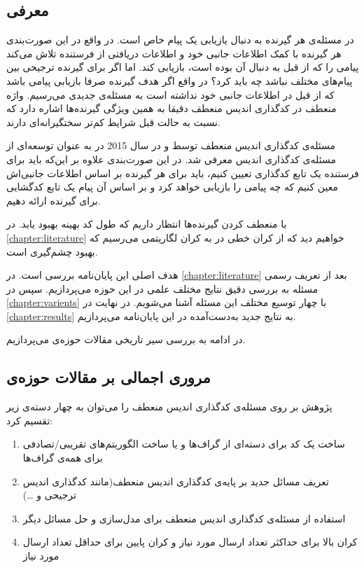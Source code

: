  \subsection{معرفی}
 در مسئله‌ی
 \icod
 هر گیرنده به دنبال یازیابی یک پیام خاص است. در واقع در این صورت‌بندی هر گیرنده با کمک اطلاعات جانبی خود و اطلاعات دریافتی از فرستنده تلاش می‌کند پیامی را که از قبل به دنبال آن بوده است، بازیابی کند. اما اگر برای گیرنده ترجیحی بین پیام‌های مختلف نباشد چه باید کرد؟ در واقع اگر هدف گیرنده صرفا بازیابی پیامی باشد که از قبل در اطلاعات جانبی خود نداشته است به مسئله‌ی جدیدی می‌رسیم. واژه منعطف در کدگذاری اندیس منعطف دقیقا به همین ویژگی گیرنده‌ها اشاره دارد که نسبت به حالت قبل شرایط کم‌تر سختگیرانه‌ای دارند.
 
 مسئله‌ی کدگذاری اندیس منعطف توسط 
 و 
  در سال 2015 در
 \cite{pliablefirstpaper}
 به عنوان توسعه‌ای از مسئله‌ی کدگذاری اندیس معرفی شد. در این صورت‌بندی علاوه بر این‌که باید برای فرستنده یک تابع کدگذاری تعیین کنیم، باید برای هر گیرنده بر اساس اطلاعات جانبی‌اش معین کنیم که چه پیامی را بازيابی خواهد کرد و بر اساس آن پیام یک تابع کدگشایی برای گیرنده ارائه دهیم.
 
 با منعطف کردن گیرنده‌ها انتظار داریم که طول کد بهینه بهبود یابد. در 
 \autoref{chapter:literature}
 خواهیم دید که از کران خطی در
 \icod
 به کران لگاریتمی می‌رسیم که بهبود چشم‌گیری است.
 
 هدف اصلی این پایان‌نامه بررسی
 \picod
 است. در 
 \autoref{chapter:literature}
 بعد از تعریف رسمی مسئله به بررسی دقیق نتایج مختلف علمی در این حوزه می‌پردازیم. سپس در 
 \autoref{chapter:varients}
  با چهار توسیع مختلف این مسئله آشنا می‌شویم. در نهایت در
  \autoref{chapter:results}
  به نتایج جدید به‌‌دست‌آمده در این پایان‌نامه می‌پردازیم.
  
  در ادامه به بررسی سیر تاریخی مقالات حوزه‌ی
  \picod
  می‌پردازیم.

 \subsection{مروری اجمالی بر مقالات حوزه‌ی
 	\picod}
  پژوهش بر روی مسئله‌ی کدگذاری اندیس منعطف را می‌توان به چهار دسته‌ی زیر تقسیم کرد:
 \begin{enumerate}
 	\item 
 	ساخت یک کد برای دسته‌ای از گراف‌ها و یا ساخت الگوریتم‌های تقریبی/تصادفی برای همه‌ی گراف‌ها
 	\item 
 	تعریف مسائل جدید بر پایه‌ی کدگذاری اندیس منعطف(مانند کدگذاری اندیس ترجیحی و \ldots)
 	\item 
 	استفاده از مسئله‌ی کدگذاری اندیس منعطف برای مدل‌سازی و حل مسائل دیگر
 	\item 
 	کران بالا برای حداکثر تعداد ارسال مورد نیاز و کران پایین برای حداقل تعداد ارسال مورد نیاز
 \end{enumerate}
 
